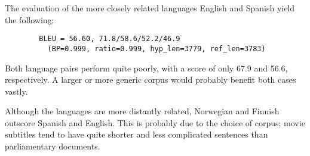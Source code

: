 \documentclass[11pt,a4paper]{article}
\begin{document}
      The evaluation of the more closely related languages English and Spanish yield the following:

      \begin{verbatim}
        BLEU = 56.60, 71.8/58.6/52.2/46.9
          (BP=0.999, ratio=0.999, hyp_len=3779, ref_len=3783)
      \end{verbatim}

      Both language pairs perform quite poorly, with a score of only 67.9 and 56.6, respectively.
      A larger or more generic corpus would probably benefit both cases vastly.

      Although the languages are more distantly related, Norwegian and Finnish outscore Spanish and English.
      This is probably due to the choice of corpus;
      movie subtitles tend to have quite shorter and less complicated sentences than parliamentary documents.

\end{document}
